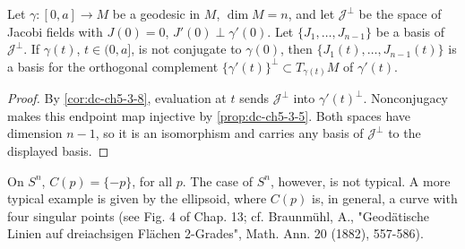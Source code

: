 \begin{corollary}
  \label{cor:dc-ch5-3-10}


  Let $\gamma:[0,a]\to M$ be a geodesic in $M$, $\dim M=n$, and let
  $\mathcal{J}^\perp$ be the space of Jacobi fields with $J(0)=0$,
  $J'(0)\perp\gamma'(0)$. Let $\{J_1,\dots,J_{n-1}\}$ be a basis of
  $\mathcal{J}^\perp$. If $\gamma(t)$, $t\in(0,a]$, is not conjugate to $\gamma(0)$,
  then $\{J_1(t),\dots,J_{n-1}(t)\}$ is a basis for the orthogonal complement
  $\{\gamma'(t)\}^\perp\subset T_{\gamma(t)}M$ of $\gamma'(t)$.
\end{corollary}
\begin{proof}

  \sketch
  By \cref{cor:dc-ch5-3-8}, evaluation at $t$ sends
  $\mathcal J^\perp$ into $\gamma'(t)^\perp$. Nonconjugacy makes this endpoint
  map injective by \cref{prop:dc-ch5-3-5}. Both spaces have dimension $n-1$,
  so it is an isomorphism and carries any basis of $\mathcal J^\perp$ to the
  displayed basis.
\end{proof}

\begin{example}
  \label{ex:dc-ch5-3-4}

  On $S^n$, $C(p)=\{-p\}$, for all $p$. The case of $S^n$, however, is not typical.
  A more typical example is given by the ellipsoid, where $C(p)$ is, in general, a
  curve with four singular points (see Fig. 4 of Chap. 13; cf. Braunmühl, A.,
  "Geodätische Linien auf dreiachsigen Flächen 2-Grades", Math. Ann. 20 (1882),
  557-586).
\end{example}
